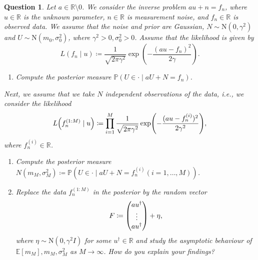\documentclass{article}
\theoremstyle{plain}
\newtheorem{question}{Question}
\theoremstyle{remark}
\newcommand{\Bb}{\mathbb}
\newcommand{\Rm}{\mathrm}
\newcommand{\PP}{\Bb P}
\newcommand{\RR}{\Bb R}
\newcommand{\EE}{\Bb E}
\newcommand{\D}{^\dagger}
\newcommand\ceq\coloneqq %
\begin{document}
\begin{question}
	Let $a \in \RR\setminus \qty{0}$. We consider the inverse problem $au + n = f_n$, where $u \in \RR$ is the unknown parameter, $n \in \RR$ is measurement noise, and $f_n \in \RR$ is observed data. We assume that the noise and prior are Gaussian, $N \sim \Rm N(0, \gamma^2)$ and $U \sim \Rm N(m_0, \sigma_0^2)$, where $\gamma^2 > 0, \sigma_0^2 > 0$. Assume that the likelihood is given by
	\[
	L(f_n \mid u) \ceq \frac1{\sqrt{2\pi\gamma^2}} \exp(- \frac{(au - f_n)^2}{2\gamma}).
	\]
	\begin{enumerate}
		\item[(i)] Compute the posterior measure $\PP(U \in \cdot \mid aU + N = f_n)$. 
	\end{enumerate}
Next, we assume that we take $N$ independent observations of the data, i.e., we consider the likelihood
\[
L\qty(f_n^{(1:M)} \mid u) \ceq \prod_{i=1}^M \frac{1}{\sqrt{2\pi \gamma^2}} \exp(- \frac{(au - f_n^{(i)})^2}{2\gamma^2}), 
\]
where $f_n^{(i)} \in \RR$. 
\begin{enumerate}
	\item[(ii)] Compute the posterior measure $N(m_M, \sigma_M^2) \ceq \PP(U \in \cdot \mid aU + N = f_n^{(i)} (i = 1, \dotsc, M))$. 
	\item[(iii)] Replace the data $f_n^{(1:M)}$ in the posterior by the random vector
	\[
	F \ceq \mqty(a u\D \\ \vdots \\ a u\D) + \eta,
	\]
	where $\eta \sim \Rm N(0, \gamma^2 I)$ for some $u\D \in \RR$ and study the asymptotic behaviour of $\EE[m_M], m_M, \sigma_M^2$ as $M \to\infty$. How do you explain your findings?
\end{enumerate}
\end{question}
\end{document}
